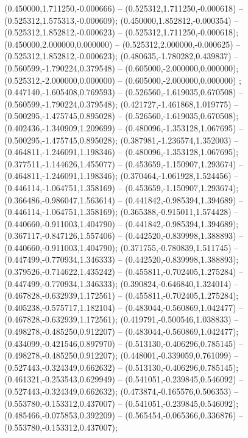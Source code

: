  (0.450000,1.711250,-0.000666) -- (0.525312,1.711250,-0.000618) -- (0.525312,1.575313,-0.000609);
 (0.450000,1.852812,-0.000354) -- (0.525312,1.852812,-0.000623) -- (0.525312,1.711250,-0.000618);
 (0.450000,2.000000,0.000000) -- (0.525312,2.000000,-0.000625) -- (0.525312,1.852812,-0.000623);
 (0.480635,-1.780282,0.439837) -- (0.560599,-1.790224,0.379548) -- (0.605000,-2.000000,0.000000);
 (0.525312,-2.000000,0.000000) -- (0.605000,-2.000000,0.000000) ;
 (0.447140,-1.605408,0.769593) -- (0.526560,-1.619035,0.670508) -- (0.560599,-1.790224,0.379548);
 (0.421727,-1.461868,1.019775) -- (0.500295,-1.475745,0.895028) -- (0.526560,-1.619035,0.670508);
 (0.402436,-1.340909,1.209699) -- (0.480096,-1.353128,1.067695) -- (0.500295,-1.475745,0.895028);
 (0.387981,-1.236574,1.352003) -- (0.464811,-1.246091,1.198346) -- (0.480096,-1.353128,1.067695);
 (0.377511,-1.144626,1.455077) -- (0.453659,-1.150907,1.293674) -- (0.464811,-1.246091,1.198346);
 (0.370464,-1.061928,1.524456) -- (0.446114,-1.064751,1.358169) -- (0.453659,-1.150907,1.293674);
 (0.366486,-0.986047,1.563614) -- (0.441842,-0.985394,1.394689) -- (0.446114,-1.064751,1.358169);
 (0.365388,-0.915011,1.574428) -- (0.440660,-0.911003,1.404790) -- (0.441842,-0.985394,1.394689);
 (0.367117,-0.847126,1.557406) -- (0.442520,-0.839998,1.388893) -- (0.440660,-0.911003,1.404790);
 (0.371755,-0.780839,1.511745) -- (0.447499,-0.770934,1.346333) -- (0.442520,-0.839998,1.388893);
 (0.379526,-0.714622,1.435242) -- (0.455811,-0.702405,1.275284) -- (0.447499,-0.770934,1.346333);
 (0.390824,-0.646840,1.324014) -- (0.467828,-0.632939,1.172561) -- (0.455811,-0.702405,1.275284);
 (0.405238,-0.575717,1.182104) -- (0.483044,-0.560869,1.042477) -- (0.467828,-0.632939,1.172561);
 (0.419791,-0.500546,1.038833) -- (0.498278,-0.485250,0.912207) -- (0.483044,-0.560869,1.042477);
 (0.434099,-0.421546,0.897970) -- (0.513130,-0.406296,0.785145) -- (0.498278,-0.485250,0.912207);
 (0.448001,-0.339059,0.761099) -- (0.527443,-0.324349,0.662632) -- (0.513130,-0.406296,0.785145);
 (0.461321,-0.253543,0.629949) -- (0.541051,-0.239845,0.546092) -- (0.527443,-0.324349,0.662632);
 (0.473874,-0.165576,0.506353) -- (0.553780,-0.153312,0.437007) -- (0.541051,-0.239845,0.546092);
 (0.485466,-0.075853,0.392209) -- (0.565454,-0.065366,0.336876) -- (0.553780,-0.153312,0.437007);
